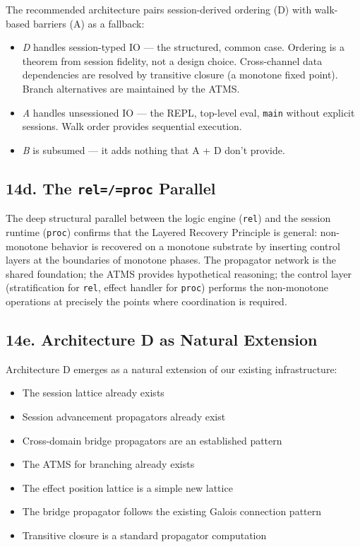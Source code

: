 \documentclass[11pt]{article}
\begin{document}
The recommended architecture pairs session-derived ordering (D) with walk-based
barriers (A) as a fallback:

\begin{itemize}
\item \emph{D} handles session-typed IO — the structured, common case. Ordering is
a theorem from session fidelity, not a design choice. Cross-channel data
dependencies are resolved by transitive closure (a monotone fixed point).
Branch alternatives are maintained by the ATMS.
\item \emph{A} handles unsessioned IO — the REPL, top-level eval, \texttt{main} without
explicit sessions. Walk order provides sequential execution.
\item \emph{B} is subsumed — it adds nothing that A + D don't provide.
\end{itemize}
\subsection{14d. The \texttt{rel=/=proc} Parallel}
\label{sec:org06916a3}

The deep structural parallel between the logic engine (\texttt{rel}) and the session
runtime (\texttt{proc}) confirms that the Layered Recovery Principle is general:
non-monotone behavior is recovered on a monotone substrate by inserting control
layers at the boundaries of monotone phases. The propagator network is the
shared foundation; the ATMS provides hypothetical reasoning; the control layer
(stratification for \texttt{rel}, effect handler for \texttt{proc}) performs the non-monotone
operations at precisely the points where coordination is required.
\subsection{14e. Architecture D as Natural Extension}
\label{sec:org1e13bd9}

Architecture D emerges as a natural extension of our existing infrastructure:

\begin{itemize}
\item The session lattice already exists
\item Session advancement propagators already exist
\item Cross-domain bridge propagators are an established pattern
\item The ATMS for branching already exists
\item The effect position lattice is a simple new lattice
\item The bridge propagator follows the existing Galois connection pattern
\item Transitive closure is a standard propagator computation
\end{itemize}
\end{document}

